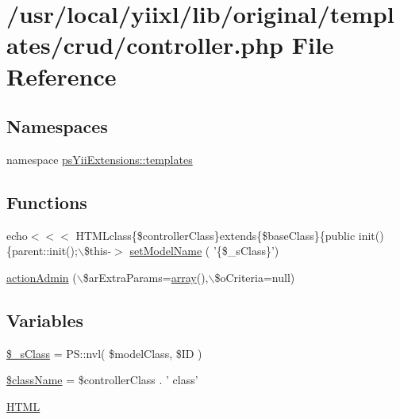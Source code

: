 \hypertarget{crud_2controller_8php}{
\section{/usr/local/yiixl/lib/original/templates/crud/controller.php File Reference}
\label{crud_2controller_8php}
}
\subsection*{Namespaces}
\begin{DoxyCompactItemize}
\item 
namespace \hyperlink{namespacepsYiiExtensions_1_1templates}{psYiiExtensions::templates}
\end{DoxyCompactItemize}
\subsection*{Functions}
\begin{DoxyCompactItemize}
\item 
echo$<$$<$$<$ HTMLclass\{\$controllerClass\}extends\{\$baseClass\}\{public init()\{parent::init();$\backslash$\$this-\/$>$ \hyperlink{crud_2controller_8php_ae6ce858af9c0a042cb66462891bea7ba}{setModelName} ( '\{\$\_\-sClass\}')
\item 
\hyperlink{crud_2controller_8php_ac07535441a96d81597bbb6a32aa02c87}{actionAdmin} ($\backslash$\$arExtraParams=\hyperlink{list_8php_aa3205d038c7f8feb5c9f01ac4dfadc88}{array}(),$\backslash$\$oCriteria=null)
\end{DoxyCompactItemize}
\subsection*{Variables}
\begin{DoxyCompactItemize}
\item 
\hyperlink{crud_2controller_8php_a7d53885feef470ba528847a3f2f1f93a}{\$\_\-sClass} = PS::nvl( \$modelClass, \$ID )
\item 
\hyperlink{crud_2controller_8php_acd6a475a6eeb092f4eea3e19e502d67d}{\$className} = \$controllerClass . ' class'
\item 
\hyperlink{crud_2controller_8php_a2c8135527015cd4586959ac7c2ffec92}{HTML}
\end{DoxyCompactItemize}


